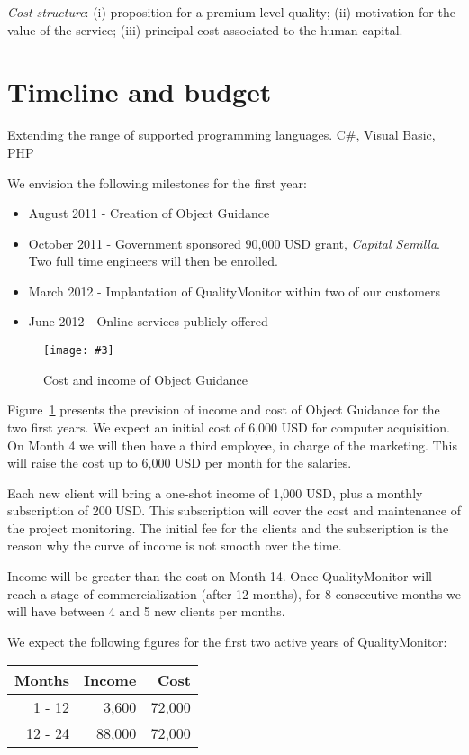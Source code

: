 \documentclass[runningheads]{llncs}
\newcommand{\fig}[4]{
	\begin{figure}[#1]
		\centering
		\texttt{[image: \#3]}
		\caption{\label{fig:#3}#4}
	\end{figure}}
\newcommand{\figref}[1]{Figure~\ref{fig:#1}}
\begin{document}
\noindent\emph{Cost structure}: (i) proposition for a premium-level quality; (ii) motivation for the value of the service; (iii) principal cost associated to the human capital. 

\section{Timeline and budget}

Extending the range of supported programming languages. C\#, Visual Basic, PHP

We envision the following milestones for the first year:

\begin{itemize}
\item August 2011 - Creation of Object Guidance
\item October 2011 - Government sponsored 90,000 USD grant, \emph{Capital Semilla}. Two full time engineers will then be enrolled. 
\item March 2012 - Implantation of QualityMonitor within two of our customers
\item June 2012 - Online services publicly offered 
\end{itemize}

\fig{}{1}{income}{Cost and income of Object Guidance}

\figref{income} presents the prevision of income and cost of Object Guidance for the two first years. We expect an initial cost of 6,000 USD for computer acquisition. On Month 4 we will then have a third employee, in charge of the marketing. This will raise the cost up to 6,000 USD per month for the salaries. 

Each new client will bring a one-shot income of 1,000 USD, plus a monthly subscription of 200 USD. This subscription will cover the cost and maintenance of the project monitoring. The initial fee for the clients and the subscription is the reason why the curve of income is not smooth over the time.

Income will be greater than the cost on Month 14. Once QualityMonitor will reach a stage of commercialization (after 12 months), for 8 consecutive months we will have between 4 and 5 new clients per months. 

We expect the following figures for the first two active years of QualityMonitor:
\begin{center}
\begin{tabular}{|r|r|r|}
\hline
\textbf{Months} 	&	\textbf{Income}	& \textbf{Cost} \\\hline\hline
1 - 12	&	3,600	& 72,000\\\hline
12 - 24	&	88,000	& 72,000\\
\hline
\end{tabular}
\end{center}
\end{document}
